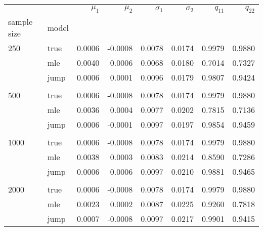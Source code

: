 \begin{tabular}{llrrrrrr}
\toprule
     &      &  $\mu_1$ &  $\mu_2$ &  $\sigma_1$ &  $\sigma_2$ &  $q_{11}$ &  $q_{22}$ \\
sample size & model &          &          &             &             &         &         \\
\midrule
250  & true &   0.0006 &  -0.0008 &      0.0078 &      0.0174 &  0.9979 &  0.9880 \\
     & mle &   0.0040 &   0.0006 &      0.0068 &      0.0180 &  0.7014 &  0.7327 \\
     & jump &   0.0006 &   0.0001 &      0.0096 &      0.0179 &  0.9807 &  0.9424 \\
     \\
500  & true &   0.0006 &  -0.0008 &      0.0078 &      0.0174 &  0.9979 &  0.9880 \\
     & mle &   0.0036 &   0.0004 &      0.0077 &      0.0202 &  0.7815 &  0.7136 \\
     & jump &   0.0006 &  -0.0001 &      0.0097 &      0.0197 &  0.9854 &  0.9459 \\
     \\
1000 & true &   0.0006 &  -0.0008 &      0.0078 &      0.0174 &  0.9979 &  0.9880 \\
     & mle &   0.0038 &   0.0003 &      0.0083 &      0.0214 &  0.8590 &  0.7286 \\
     & jump &   0.0006 &  -0.0006 &      0.0097 &      0.0210 &  0.9881 &  0.9465 \\
     \\
2000 & true &   0.0006 &  -0.0008 &      0.0078 &      0.0174 &  0.9979 &  0.9880 \\
     & mle &   0.0023 &   0.0002 &      0.0087 &      0.0225 &  0.9260 &  0.7818 \\
     & jump &   0.0007 &  -0.0008 &      0.0097 &      0.0217 &  0.9901 &  0.9415 \\
\bottomrule
\end{tabular}
